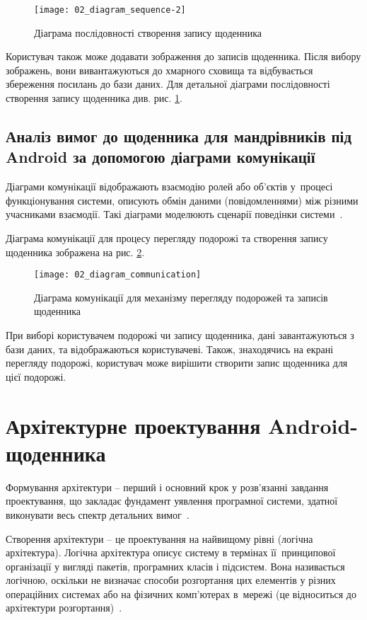 \documentclass[../main.tex]{subfiles}
\begin{document}
\begin{figure}[H]
	\centering
	\texttt{[image: 02\_diagram\_sequence-2]}
	\caption{Діаграма послідовності створення запису щоденника}
	\label{diagram:sequence_diary}
\end{figure}

Користувач також може додавати зображення до записів щоденника. Після вибору зображень, вони вивантажуються до хмарного сховища та відбувається збереження посилань до бази даних. Для детальної діаграми послідовності створення запису щоденника див. рис. \ref{diagram:sequence_diary}.

\subsection{Аналіз вимог до щоденника для мандрівників під Android за допомогою діаграми комунікації}
Діаграми комунікації відображають взаємодію ролей або об'єктів у~процесі функціонування системи, описують обмін даними (повідомленнями) між різними учасниками взаємодії. Такі діаграми моделюють сценарії поведінки системи~\cite{diploma_guidelines}. 

Діаграма комунікації для процесу перегляду подорожі та створення запису щоденника зображена на рис. \ref{diagram:communication}.

\begin{figure}[H]
	\centering
	\texttt{[image: 02\_diagram\_communication]}
	\caption{Діаграма комунікації для механізму перегляду подорожей та записів щоденника}
	\label{diagram:communication}
\end{figure}

При виборі користувачем подорожі чи запису щоденника, дані завантажуються з бази даних, та відображаються користувачеві. Також, знаходячись на екрані перегляду подорожі, користувач може вирішити створити запис щоденника для цієї подорожі.

\section{Архітектурне проектування Android-щоденника}
Формування архітектури – перший і основний крок у розв’язанні завдання проектування, що закладає фундамент уявлення програмної системи, здатної виконувати весь спектр детальних вимог~\cite{diploma_guidelines2}.

Створення архітектури – це проектування на найвищому рівні (логічна архітектура). Логічна архітектура описує систему в термінах її~принципової організації у вигляді пакетів, програмних класів і підсистем. Вона називається логічною, оскільки не визначає способи розгортання цих елементів у різних операційних системах або на фізичних комп’ютерах в~мережі (це відноситься до архітектури розгортання)~\cite{diploma_guidelines}.
\end{document}
